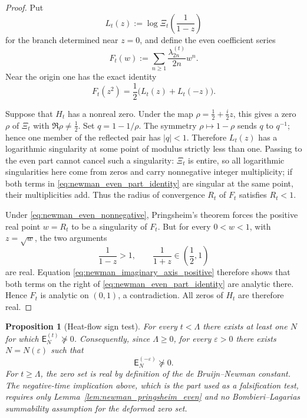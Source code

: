 \documentclass[11pt]{amsart}
\numberwithin{equation}{section}
\theoremstyle{plain}
\newtheorem{proposition}[theorem]{Proposition}
\theoremstyle{definition}
\theoremstyle{remark}
\newcommand{\E}{\mathsf E}
\begin{document}
\begin{proof}
Put
\[
L_t(z):=\log \Xi_t\!\left(\frac1{1-z}\right)
\]
for the branch determined near \(z=0\), and define the even coefficient series
\begin{equation}
F_t(w):=\sum_{n\ge1}\frac{\lambda_{2n}^{(t)}}{2n}w^n.
\label{eq:newman_even_series}
\end{equation}
Near the origin one has the exact identity
\begin{equation}
F_t(z^2)=\frac12\bigl(L_t(z)+L_t(-z)\bigr).
\label{eq:newman_even_part_identity}
\end{equation}

Suppose that \(H_t\) has a nonreal zero.  Under the map
\(\rho=\tfrac12+\tfrac{i}{2}z\), this gives a zero \(\rho\) of \(\Xi_t\) with
\(\Re\rho\ne\tfrac12\).  Set \(q=1-1/\rho\).  The symmetry
\(\rho\mapsto1-\rho\) sends \(q\) to \(q^{-1}\); hence one member of the reflected pair has
\(|q|<1\).  Therefore \(L_t(z)\) has a logarithmic singularity at some point of modulus strictly
less than one.  Passing to the even part cannot cancel such a singularity: \(\Xi_t\) is entire, so
all logarithmic singularities here come from zeros and carry nonnegative integer multiplicity; if
both terms in \eqref{eq:newman_even_part_identity} are singular at the same point, their
multiplicities add.  Thus the radius of convergence \(R_t\) of \(F_t\) satisfies \(R_t<1\).

Under \eqref{eq:newman_even_nonnegative}, Pringsheim's theorem forces the positive real point
\(w=R_t\) to be a singularity of \(F_t\).  But for every \(0<w<1\), with \(z=\sqrt w\), the two
arguments
\[
\frac1{1-z}>1,
\qquad
\frac1{1+z}\in\left(\frac12,1\right)
\]
are real.  Equation \eqref{eq:newman_imaginary_axis_positive} therefore shows that both terms on
the right of \eqref{eq:newman_even_part_identity} are analytic there.  Hence \(F_t\) is analytic
on \((0,1)\), a contradiction.  All zeros of \(H_t\) are therefore real.
\end{proof}

\begin{proposition}[Heat-flow sign test]
\label{prop:newman_matrix_filter}
For every \(t<\Lambda\) there exists at least one \(N\) for which
\(\E_N^{(t)}\not\succeq0\).  Consequently, since \(\Lambda\ge0\), for every
\(\varepsilon>0\) there exists \(N=N(\varepsilon)\) such that
\begin{equation}
\boxed{\E_N^{(-\varepsilon)}\not\succeq0.}
\label{eq:newman_negative_time_failure}
\end{equation}
For \(t\ge\Lambda\), the zero set is real by definition of the de Bruijn--Newman constant.
The negative-time implication above, which is the part used as a falsification test, requires only
Lemma~\ref{lem:newman_pringsheim_even} and no Bombieri--Lagarias summability assumption for the
deformed zero set.
\end{proposition}
\end{document}
